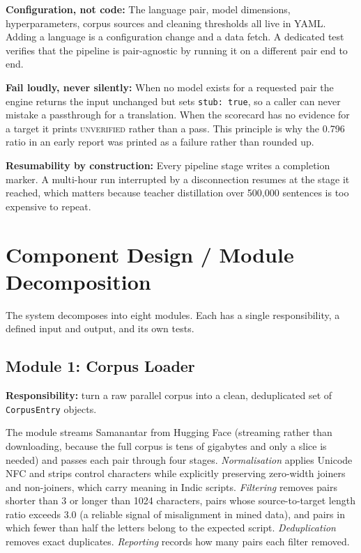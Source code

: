 \textbf{Configuration, not code:} The language pair, model dimensions,
hyperparameters, corpus sources and cleaning thresholds all live in YAML.
Adding a language is a configuration change and a data fetch. A dedicated test
verifies that the pipeline is pair-agnostic by running it on a different pair
end to end.

\textbf{Fail loudly, never silently:} When no model exists for a requested pair
the engine returns the input unchanged but sets \texttt{stub: true}, so a caller
can never mistake a passthrough for a translation. When the scorecard has no
evidence for a target it prints \textsc{unverified} rather than a pass. This
principle is why the 0.796 ratio in an early report was printed as a failure
rather than rounded up.

\textbf{Resumability by construction:} Every pipeline stage writes a completion
marker. A multi-hour run interrupted by a disconnection resumes at the stage it
reached, which matters because teacher distillation over 500{,}000 sentences is
too expensive to repeat.

\section{Component Design / Module Decomposition}
\label{sec:modules}

The system decomposes into eight modules. Each has a single responsibility, a
defined input and output, and its own tests.

\subsection{Module 1: Corpus Loader}
\label{subsec:mod1}

\textbf{Responsibility:} turn a raw parallel corpus into a clean, deduplicated
set of \texttt{CorpusEntry} objects.

The module streams Samanantar from Hugging Face (streaming rather than
downloading, because the full corpus is tens of gigabytes and only a slice is
needed) and passes each pair through four stages. \emph{Normalisation}
applies Unicode NFC and strips control characters while explicitly preserving
zero-width joiners and non-joiners, which carry meaning in Indic scripts.
\emph{Filtering} removes pairs shorter than 3 or longer than 1024 characters,
pairs whose source-to-target length ratio exceeds 3.0 (a reliable signal of
misalignment in mined data), and pairs in which fewer than half the letters
belong to the expected script. \emph{Deduplication} removes exact duplicates.
\emph{Reporting} records how many pairs each filter removed.

